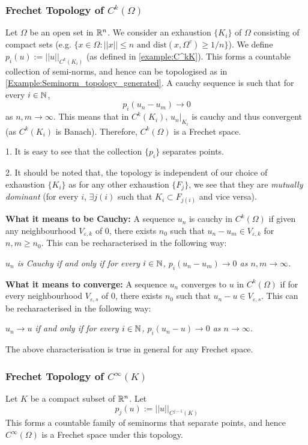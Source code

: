 \subsubsection{Frechet Topology of $C^k(\Omega)$}
Let $\Omega$ be an open set in $\mathbb{R}^n$. We consider an exhaustion $\{K_i\}$ of $\Omega$ consisting of compact sets (e.g. $\{x\in \Omega:||x||\leq n \text{ and } \mathrm{dist}(x,\Omega^c)\geq 1/n \}$). We define $p_i(u):=||u||_{C^k(K_i)}$ (as defined in \ref{example:C^kK}). This forms a countable collection of semi-norms, and hence can be topologised as in \ref{Example:Seminorm_topology_generated}. A cauchy sequence is such that for every $i\in \mathbb{N}$, $$p_i(u_n-u_m)\to 0$$ as $n,m \to \infty$. This means that in $C^k(K_i)$, $u_n|_{K_i}$ is cauchy and thus convergent (as $C^k(K_i)$ is Banach).  Therefore, $C^k(\Omega)$ is a Frechet space. 
\begin{remark} 1. It is easy to see that the collection $\{p_i\}$ separates points.

2. It should be noted that, the topology is independent of our choice of exhaustion $\{K_i\}$ as for any other exhaustion $\{F_j\}$, we see that they are \emph{mutually dominant} (for every $i$, $\exists j(i)$ such that $K_i\subset F_{j(i)}$ and vice versa). 
\end{remark}
\textbf{What it means to be Cauchy:} A sequence $u_n$ is cauchy in $C^k(\Omega)$ if given any neighbourhood $V_{\varepsilon,k}$ of $0$, there exists $n_0$ such that $u_n-u_m \in V_{\varepsilon,k}$ for $n,m\geq n_0$. This can be recharacterised in the following way: 
\begin{center}
\emph{$u_n$ is Cauchy if and only if for every $i\in \mathbb{N}$, $p_i(u_n-u_m)\to 0$ as $n,m \to \infty$.}
    
\end{center}

\textbf{What it means to converge:} A sequence $u_n$ converges to $u$ in $C^k(\Omega)$ if for every neighbourhood $V_{\varepsilon,s}$ of $0$, there exists $n_0$ such that $u_n-u \in V_{\varepsilon,s}$. This can be recharacterised in the following way: 
\begin{center}
    \emph{$u_n\to u$ if and only if for every $i\in \mathbb{N}$, $p_i(u_n-u)\to 0$ as $n\to \infty$. }
\end{center}
\begin{remark}
    The above characterisation is true in general for any Frechet space. 
\end{remark}

\subsubsection{Frechet Topology of $C^{\infty}(K)$}
Let $K$ be a compact subset of $\mathbb{R}^n$. Let $$p_j(u):=||u||_{C^{j-1}(K)}$$
This forms a countable family of seminorms that separate points, and hence $C^{\infty}(\Omega)$ is a Frechet space under this topology.

